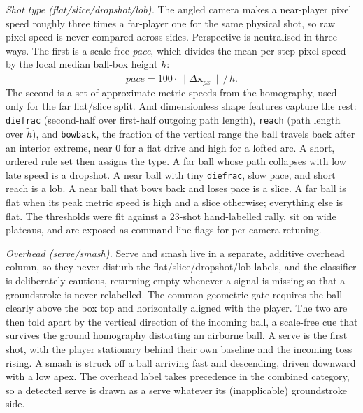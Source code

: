 \documentclass[11pt]{article}
\begin{document}
\textit{Shot type (flat/slice/dropshot/lob).} The angled camera makes a near-player pixel speed roughly three times a far-player one for the same physical shot, so raw pixel speed is never compared across sides. Perspective is neutralised in three ways. The first is a scale-free \emph{pace}, which divides the mean per-step pixel speed by the local median ball-box height $\tilde h$:
\begin{equation}
\mathit{pace} = 100\cdot \overline{\lVert\Delta\mathbf{x}_{px}\rVert} \,/\, \tilde h .
\end{equation}
The second is a set of approximate metric speeds from the homography, used only for the far flat/slice split. And dimensionless shape features capture the rest: \texttt{diefrac} (second-half over first-half outgoing path length), \texttt{reach} (path length over $\tilde h$), and \texttt{bowback}, the fraction of the vertical range the ball travels back after an interior extreme, near $0$ for a flat drive and high for a lofted arc. A short, ordered rule set then assigns the type. A far ball whose path collapses with low late speed is a dropshot. A near ball with tiny \texttt{diefrac}, slow pace, and short reach is a lob. A near ball that bows back and loses pace is a slice. A far ball is flat when its peak metric speed is high and a slice otherwise; everything else is flat. The thresholds were fit against a 23-shot hand-labelled rally, sit on wide plateaus, and are exposed as command-line flags for per-camera retuning.

\textit{Overhead (serve/smash).} Serve and smash live in a separate, additive overhead column, so they never disturb the flat/slice/dropshot/lob labels, and the classifier is deliberately cautious, returning empty whenever a signal is missing so that a groundstroke is never relabelled. The common geometric gate requires the ball clearly above the box top and horizontally aligned with the player. The two are then told apart by the vertical direction of the incoming ball, a scale-free cue that survives the ground homography distorting an airborne ball. A serve is the first shot, with the player stationary behind their own baseline and the incoming toss rising. A smash is struck off a ball arriving fast and descending, driven downward with a low apex. The overhead label takes precedence in the combined category, so a detected serve is drawn as a serve whatever its (inapplicable) groundstroke side.
\end{document}
